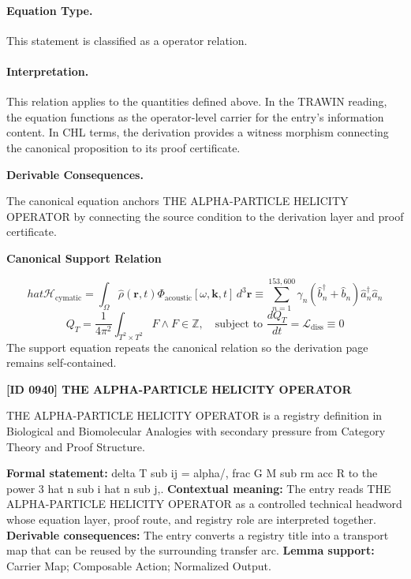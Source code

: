 \paragraph{Equation Type.}
This statement is classified as a operator relation.

\paragraph{Interpretation.}
This relation applies to the quantities defined above. In the TRAWIN reading, the equation functions as the operator-level carrier for the entry’s information content. In CHL terms, the derivation provides a witness morphism connecting the canonical proposition to its proof certificate.

\par\vspace{0.35em}
\noindent\textbf{Derivable Consequences.}\quad
\begingroup
\footnotesize
\raggedright
The canonical equation anchors THE ALPHA-PARTICLE HELICITY OPERATOR by connecting the source condition to the derivation layer and proof certificate.
\par\endgroup

\noindent\textbf{Canonical Support Relation}\par
\[
hat{\mathcal{H}}_{\text{cymatic}} = \int_{\Omega} \hat{\rho}(\mathbf{r}, t) \Phi_{\text{acoustic}}[\omega, \mathbf{k}, t] \, d^3\mathbf{r} \equiv \sum_{n=1}^{153,600} \gamma_n (\hat{b}_n^\dagger + \hat{b}_n) \hat{a}_n^\dagger \hat{a}_n
\]
\[
Q_T = \frac{1}{4\pi^2} \int_{T^2 \times T^2} F \wedge F \in \mathbb{Z}, \quad \text{subject to } \frac{dQ_T}{dt} = \mathcal{L}_{\text{diss}} \equiv 0
\]
\noindent The support equation repeats the canonical relation so the derivation page remains self-contained.\par

\clearpage
\noindent\textbf{[ID 0940] THE ALPHA-PARTICLE HELICITY OPERATOR}\par
\vspace{0.35em}
\begingroup\small
{}
THE ALPHA-PARTICLE HELICITY OPERATOR is a registry definition in Biological and Biomolecular Analogies with secondary pressure from Category Theory and Proof Structure.

\begingroup\footnotesize\setlength{\emergencystretch}{3em}\sloppy
\textbf{Formal statement:} delta T sub ij = alpha/, frac G M sub rm acc R to the power 3 hat n sub i hat n sub j,. \textbf{Contextual meaning:} The entry reads THE ALPHA-PARTICLE HELICITY OPERATOR as a controlled technical headword whose equation layer, proof route, and registry role are interpreted together. \textbf{Derivable consequences:} The entry converts a registry title into a transport map that can be reused by the surrounding transfer arc. \textbf{Lemma support:} Carrier Map; Composable Action; Normalized Output.\par
\endgroup

